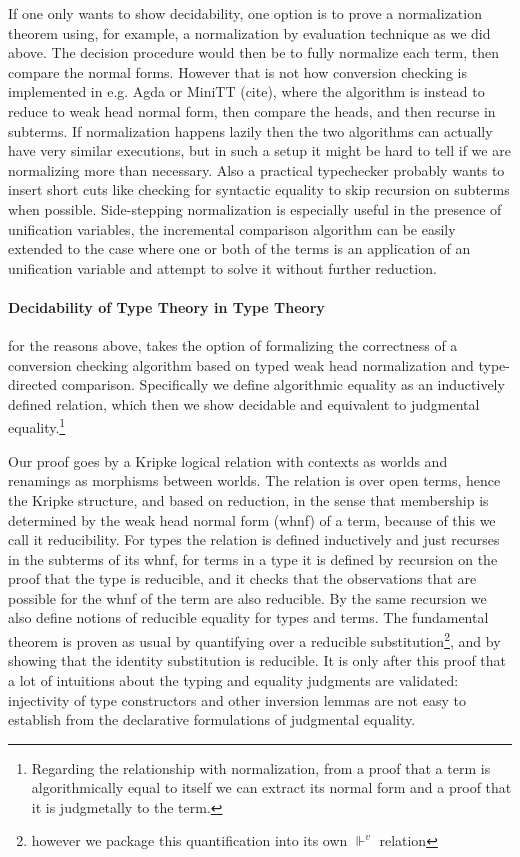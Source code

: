 \documentclass{book}
\begin{document}
If one only wants to show decidability, one option is to prove a
normalization theorem using, for example, a normalization by
evaluation technique as we did above. The decision procedure would
then be to fully normalize each term, then compare the normal forms.
However that is not how conversion checking is implemented in
e.g. Agda or MiniTT (cite), where the algorithm is instead to reduce
to weak head normal form, then compare the heads, and then recurse in
subterms. If normalization happens lazily then the two algorithms can
actually have very similar executions, but in such a setup it might be
hard to tell if we are normalizing more than necessary. Also a
practical typechecker probably wants to insert short cuts like
checking for syntactic equality to skip recursion on subterms when
possible. Side-stepping normalization is especially useful in the
presence of unification variables, the incremental comparison
algorithm can be easily extended to the case where one or both of the
terms is an application of an unification variable and attempt to
solve it without further reduction.


\paragraph{Decidability of Type Theory in Type Theory} for the reasons above,
takes the option of formalizing the correctness of a conversion
checking algorithm based on typed weak head normalization and
type-directed comparison. Specifically we define algorithmic equality
as an inductively defined relation, which then we show decidable and
equivalent to judgmental equality.\footnote{Regarding the relationship with
normalization, from a proof that a term is algorithmically equal to
itself we can extract its normal form and a
proof that it is judgmetally to the term.}

Our proof goes by a Kripke logical relation with contexts as worlds
and renamings as morphisms between worlds. The relation is over open
terms, hence the Kripke structure, and based on reduction, in the
sense that membership is determined by the weak head normal form
(whnf) of a term, because of this we call it reducibility. For types
the relation is defined inductively and just recurses in the subterms
of its whnf, for terms in a type it is defined by recursion on the
proof that the type is reducible, and it checks that the observations
that are possible for the whnf of the term are also reducible. By the
same recursion we also define notions of reducible equality for types
and terms. The fundamental theorem is proven as usual by quantifying
over a reducible substitution\footnote{however we package this
  quantification into its own $\Vdash^v$ relation}, and by showing
that the identity substitution is reducible. It is only after this
proof that a lot of intuitions about the typing and equality judgments
are validated: injectivity of type constructors and other inversion
lemmas are not easy to establish from the declarative formulations of
judgmental equality.
\end{document}

